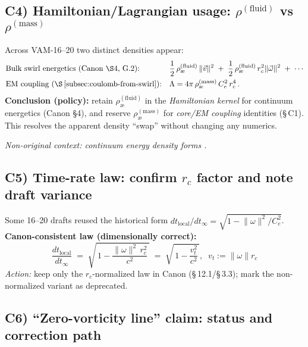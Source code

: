 \documentclass[11pt]{article}
\begin{document}
    \subsection*{C4) Hamiltonian/Lagrangian usage: $\rho^{(\text{fluid})}$ vs $\rho^{(\text{mass})}$}
    \label{subsec:rho-policy}

    Across VAM-16–20 two distinct densities appear:
    \begin{align*}
        &\text{Bulk swirl energetics (Canon \S4, G.2):}
        &&\frac{1}{2}\,\rho_{\text{\ae}}^{(\text{fluid})}\,\lVert \vec v\rVert^2
        \;+\;\frac{1}{2}\,\rho_{\text{\ae}}^{(\text{fluid})}\,r_c^{2}\lVert \vec\omega\rVert^2
        \;+\;\cdots \\
        &\text{EM coupling (\S\,\ref{subsec:coulomb-from-swirl}):}
        &&\Lambda = 4\pi\,\rho_{\text{\ae}}^{(\text{mass})}\,C_e^2\,r_c^4\,.
    \end{align*}
    \textbf{Conclusion (policy):} retain $\rho_{\text{\ae}}^{(\text{fluid})}$ in the \emph{Hamiltonian kernel} for continuum energetics (Canon \S4), and reserve $\rho_{\text{\ae}}^{(\text{mass})}$ for \emph{core/EM coupling} identities (\S\,C1). This resolves the apparent density ``swap'' without changing any numerics.

    \textit{Non-original context: continuum energy density forms \cite{LandauFluids}.}

    \subsection*{C5) Time-rate law: confirm $r_c$ factor and note draft variance}
    \label{subsec:timerate-consistency}

    Some 16–20 drafts reused the historical form $dt_{\text{local}}/dt_\infty=\sqrt{1- \lVert\omega\rVert^2/C_e^2}$.
    \textbf{Canon-consistent law (dimensionally correct):}
    \[
        \boxed{ \frac{dt_{\text{local}}}{dt_\infty} \;=\; \sqrt{\,1- \frac{\lVert\omega\rVert^2\,r_c^2}{c^2}\,}
        \;=\; \sqrt{\,1- \frac{v_t^2}{c^2}\,},\;\;v_t:=\lVert\omega\rVert r_c }
    \]
    \emph{Action:} keep only the $r_c$-normalized law in Canon (\S\,12.1/\S\,3.3); mark the non-normalized variant as deprecated.

    \subsection*{C6) ``Zero-vorticity line'' claim: status and correction path}
    \label{subsec:zero-vort-line}
\end{document}
